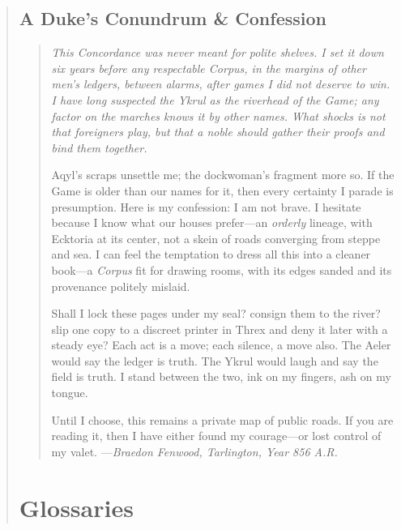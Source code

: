 \documentclass[11pt]{article}
\begin{document}
\begin{quote}
\subsection*{A Duke’s Conundrum \& Confession}

\begin{quote}\small\itshape
This \emph{Concordance} was never meant for polite shelves. I set it down six years before any respectable \emph{Corpus}, in the margins of other men’s ledgers, between alarms, after games I did not deserve to win. I have long suspected the Ykrul as the riverhead of the Game; any factor on the marches knows it by other names. What shocks is not that foreigners play, but that a noble should gather their proofs and bind them together.

Aqyl’s scraps unsettle me; the dockwoman’s fragment more so. If the Game is older than our names for it, then every certainty I parade is presumption. Here is my confession: I am not brave. I hesitate because I know what our houses prefer—an \emph{orderly} lineage, with Ecktoria at its center, not a skein of roads converging from steppe and sea. I can feel the temptation to dress all this into a cleaner book—a \emph{Corpus} fit for drawing rooms, with its edges sanded and its provenance politely mislaid.

Shall I lock these pages under my seal? consign them to the river? slip one copy to a discreet printer in Threx and deny it later with a steady eye? Each act is a move; each silence, a move also. The Aeler would say the ledger is truth. The Ykrul would laugh and say the field is truth. I stand between the two, ink on my fingers, ash on my tongue.

Until I choose, this remains a private map of public roads. If you are reading it, then I have either found my courage—or lost control of my valet.
\hfill---\textit{Braedon Fenwood, Tarlington, Year 856 A.R.}
\end{quote}

\clearpage

\section{Glossaries}

\end{quote}
\end{document}
